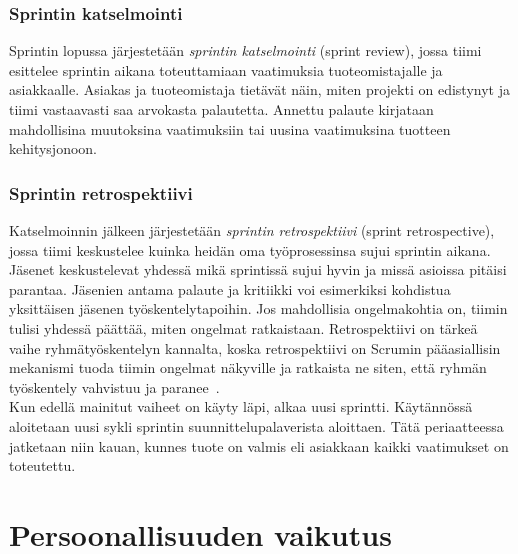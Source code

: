 \documentclass[finnish]{../tktltiki2}
\theoremstyle{definition}
\theoremstyle{remark}
\begin{document}
\subsubsection{Sprintin katselmointi}

Sprintin lopussa järjestetään \emph{sprintin katselmointi} (sprint review), jossa tiimi esittelee sprintin aikana toteuttamiaan
vaatimuksia tuoteomistajalle ja asiakkaalle. Asiakas ja tuoteomistaja
tietävät näin, miten projekti on edistynyt ja tiimi vastaavasti saa
arvokasta palautetta. Annettu palaute kirjataan mahdollisina muutoksina
vaatimuksiin tai uusina vaatimuksina tuotteen kehitysjonoon.

\subsubsection{Sprintin retrospektiivi}

Katselmoinnin jälkeen järjestetään \emph{sprintin retrospektiivi}
(sprint retrospective), jossa tiimi keskustelee kuinka heidän
oma työprosessinsa sujui sprintin aikana. Jäsenet
keskustelevat yhdessä mikä sprintissä sujui hyvin ja missä
asioissa pitäisi parantaa. Jäsenien antama palaute ja kritiikki
voi esimerkiksi kohdistua yksittäisen jäsenen työskentelytapoihin.
Jos mahdollisia ongelmakohtia on, tiimin tulisi yhdessä päättää,
miten ongelmat ratkaistaan. Retrospektiivi on tärkeä vaihe
ryhmätyöskentelyn kannalta, koska retrospektiivi on Scrumin pääasiallisin
mekanismi tuoda tiimin ongelmat näkyville ja ratkaista ne siten,
että ryhmän työskentely vahvistuu ja paranee~\cite{Scrumprimer}.\\

Kun edellä mainitut vaiheet on käyty läpi, alkaa uusi
sprintti. Käytännös\-sä aloitetaan uusi sykli
sprintin suunnittelupalaverista aloittaen. Tätä periaatteessa jatketaan
niin kauan, kunnes tuote on valmis eli asiakkaan kaikki vaatimukset
on toteutettu.


\section{Persoonallisuuden vaikutus}
\end{document}
